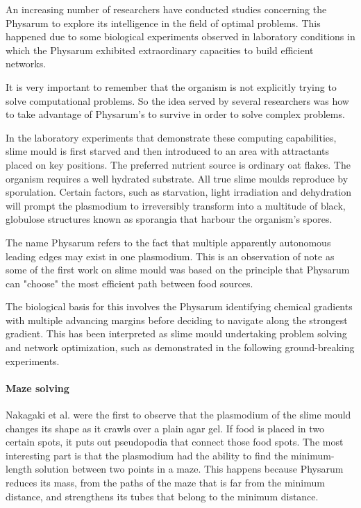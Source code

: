 
An increasing number of researchers have conducted studies concerning the Physarum to explore its intelligence in the field of optimal problems. This happened due to some biological experiments observed in laboratory conditions in which the Physarum exhibited extraordinary capacities to build efficient networks.
\par
It is very important to remember that the organism is not explicitly trying to solve computational problems. So the idea served by several researchers was how to take advantage of Physarum’s to survive in order to solve complex problems. 
\par
In the laboratory experiments that demonstrate these computing capabilities, slime mould is first starved and then introduced to an area with attractants placed on key positions. The preferred nutrient source is ordinary oat flakes. The organism requires a well hydrated substrate. All true slime moulds reproduce by sporulation. Certain factors, such as starvation, light irradiation and dehydration will prompt the plasmodium to irreversibly transform into a multitude of black, globulose structures known as sporangia that harbour the organism’s spores.
\par
The name Physarum refers to the fact that multiple apparently autonomous leading edges may exist in one plasmodium. This is an observation of note as some of the first work on slime mould was based on the principle that Physarum can "choose" the most efficient path between food sources.
\par
The biological basis for this involves the Physarum identifying chemical gradients with multiple advancing margins before deciding to navigate along the strongest gradient. This has been interpreted as slime mould undertaking problem solving and network optimization, such as demonstrated in the following ground-breaking experiments.

\paragraph{Maze solving}
Nakagaki et al. \cite{nakagaki2000intelligence} were the first to observe that the plasmodium of the slime mould changes its shape as it crawls over a plain agar gel. If food is placed in two certain spots, it puts out pseudopodia that connect those food spots. The most interesting part is that the plasmodium had the ability to find the minimum-length solution between two points in a maze. This happens because Physarum reduces its mass, from the paths of the maze that is far from the minimum distance, and strengthens its tubes that belong to the minimum distance.
